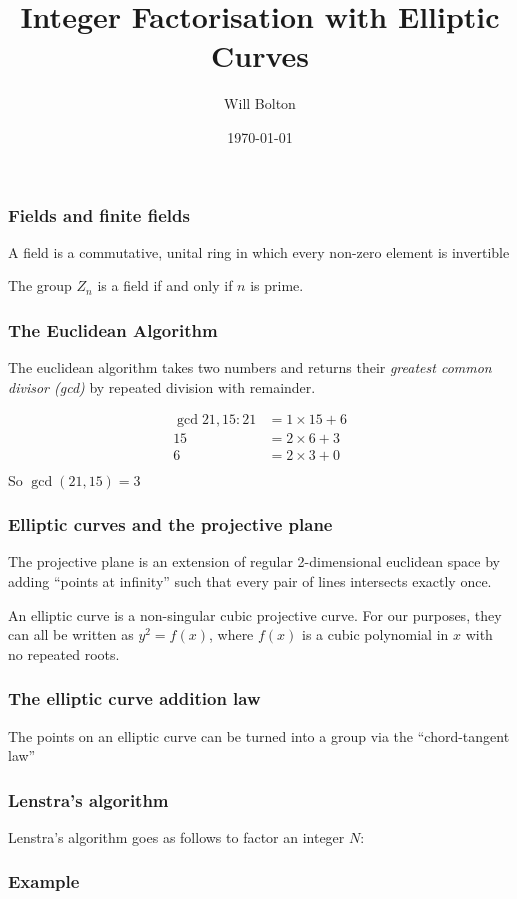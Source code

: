 \documentclass{beamer}
\title[Integer Factorisation with Elliptic Curves]{Integer Factorisation with Elliptic Curves}
\author{Will Bolton}
\date{\today}
\begin{document}
\titlepage
\begin{frame} %
\frametitle{Fields and finite fields}
\begin{definition}
	A field is a commutative, unital ring in which every non-zero element is invertible
\end{definition}
\vfill
	The group $Z_n$ is a field if and only if $n$ is prime.
\end{frame}

\begin{frame} %
\frametitle{The Euclidean Algorithm}
\begin{definition}
	The euclidean algorithm takes two numbers and returns their \emph{greatest common divisor (gcd)} by repeated division with remainder.
\end{definition}
\begin{align*}
	\gcd{21,15}:21 &= 1\times15 + 6\\
	15 &= 2\times6 + 3\\
	6 &= 2\times3 + 0\\
\end{align*}
So $\gcd(21,15)=3$
\end{frame}

\begin{frame} %
\frametitle{Elliptic curves and the projective plane}
\begin{definition}
	The projective plane is an extension of regular 2-dimensional euclidean space by adding ``points at infinity'' such that every pair of lines intersects exactly once.
\end{definition}
\begin{definition}
	An elliptic curve is a non-singular cubic projective curve. For our purposes, they can all be written as $y^2 = f(x)$, where $f(x)$ is a cubic polynomial in $x$ with no repeated roots.
\end{definition}
\end{frame}

\begin{frame} %
\frametitle{The elliptic curve addition law}
The points on an elliptic curve can be turned into a group via the ``chord-tangent law''
\end{frame}

\begin{frame} %
\frametitle{Lenstra's algorithm}
\begin{definition}
	Lenstra's algorithm goes as follows to factor an integer $N$:
\end{definition}
\end{frame}

\begin{frame} %
\frametitle{Example}

\end{frame}
\end{document}
